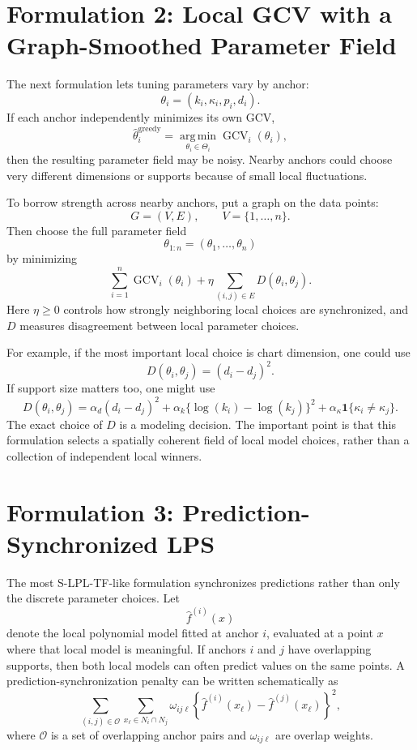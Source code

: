\documentclass[11pt]{article}
\newcommand{\GCV}{\operatorname{GCV}}
\newcommand{\argmin}{\operatorname*{arg\,min}}
\begin{document}
\section{Formulation 2: Local GCV with a Graph-Smoothed Parameter Field}

The next formulation lets tuning parameters vary by anchor:
\[
  \theta_i = (k_i,\kappa_i,p_i,d_i).
\]
If each anchor independently minimizes its own GCV,
\[
  \widehat\theta_i^{\mathrm{greedy}}
  =
  \argmin_{\theta_i\in\Theta_i}\GCV_i(\theta_i),
\]
then the resulting parameter field may be noisy.  Nearby anchors could choose
very different dimensions or supports because of small local fluctuations.

To borrow strength across nearby anchors, put a graph on the data points:
\[
  G=(V,E),
  \qquad V=\{1,\ldots,n\}.
\]
Then choose the full parameter field
\[
  \theta_{1:n}=(\theta_1,\ldots,\theta_n)
\]
by minimizing
\[
  \sum_{i=1}^{n}\GCV_i(\theta_i)
  +
  \eta
  \sum_{(i,j)\in E}
  D(\theta_i,\theta_j).
\]
Here \(\eta\ge 0\) controls how strongly neighboring local choices are
synchronized, and \(D\) measures disagreement between local parameter choices.

For example, if the most important local choice is chart dimension, one could
use
\[
  D(\theta_i,\theta_j)
  =
  (d_i-d_j)^2.
\]
If support size matters too, one might use
\[
  D(\theta_i,\theta_j)
  =
  \alpha_d(d_i-d_j)^2
  +
  \alpha_k\{\log(k_i)-\log(k_j)\}^2
  +
  \alpha_{\kappa}\mathbf{1}\{\kappa_i\ne \kappa_j\}.
\]
The exact choice of \(D\) is a modeling decision.  The important point is that
this formulation selects a spatially coherent field of local model choices,
rather than a collection of independent local winners.

\section{Formulation 3: Prediction-Synchronized LPS}

The most S-LPL-TF-like formulation synchronizes predictions rather than only
the discrete parameter choices.  Let
\[
  \widehat f^{(i)}(x)
\]
denote the local polynomial model fitted at anchor \(i\), evaluated at a point
\(x\) where that local model is meaningful.  If anchors \(i\) and \(j\) have
overlapping supports, then both local models can often predict values on the
same points.  A prediction-synchronization penalty can be written schematically
as
\[
  \sum_{(i,j)\in\mathcal O}
  \sum_{x_\ell\in N_i\cap N_j}
  \omega_{ij\ell}
  \left\{
    \widehat f^{(i)}(x_\ell)
    -
    \widehat f^{(j)}(x_\ell)
  \right\}^2,
\]
where \(\mathcal O\) is a set of overlapping anchor pairs and
\(\omega_{ij\ell}\) are overlap weights.
\end{document}
